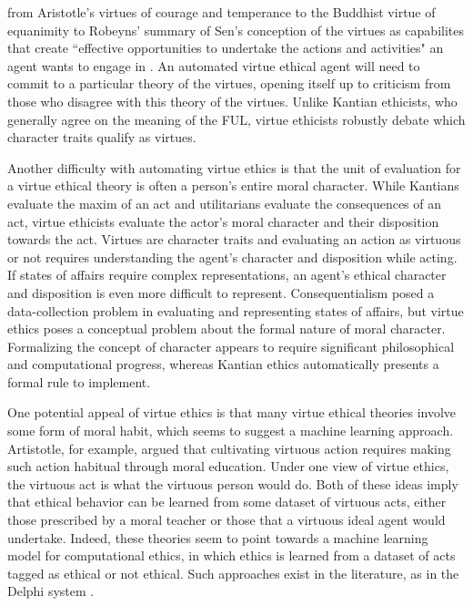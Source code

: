 \begin{isabellebody}
\begin{isamarkuptext}
from Aristotle's virtues of courage and temperance to the Buddhist virtue of 
equanimity to Robeyns' summary of Sen's conception of the virtues as capabilites that create
``effective opportunities to undertake the actions and activities" an agent wants to engage in \cite{robeyns}. 
An automated virtue ethical agent will need to commit to a particular theory of the virtues, opening 
itself up to criticism from those who disagree with this theory of the virtues. Unlike Kantian ethicists, 
who generally agree on the meaning of the FUL, virtue ethicists robustly debate which character traits qualify as virtues.%
\end{isamarkuptext}\isamarkuptrue%
%
\isadelimdocument
%
\endisadelimdocument
%
\isatagdocument
%
\isamarkuptrue%
%
\endisatagdocument
{\isafolddocument}%
%
\isadelimdocument
%
\endisadelimdocument
%
\begin{isamarkuptext}%
Another difficulty with automating virtue ethics is that the unit of evaluation for a virtue ethical
theory is often a person's entire moral character. While Kantians evaluate the maxim of an act and utilitarians
evaluate the consequences of an act, virtue ethicists evaluate the actor's moral character and their 
disposition towards the act. Virtues are character traits and evaluating an action as virtuous or 
not requires understanding the agent's character and disposition while acting. If states of affairs
require complex representations, an agent's ethical character and disposition is even more difficult
to represent. Consequentialism posed a data-collection problem in evaluating and representing states
of affairs, but virtue ethics poses a conceptual problem about the formal nature of moral character.
Formalizing the concept of character appears to require significant philosophical and computational
progress, whereas Kantian ethics automatically presents a formal rule to implement.%
\end{isamarkuptext}\isamarkuptrue%
%
\isadelimdocument
%
\endisadelimdocument
%
\isatagdocument
%
\isamarkuptrue%
%
\endisatagdocument
{\isafolddocument}%
%
\isadelimdocument
%
\endisadelimdocument
%
\begin{isamarkuptext}%
One potential appeal of virtue ethics is that many virtue ethical theories involve some form of 
moral habit, which seems to suggest a machine learning approach. Artistotle, for example, argued 
that cultivating virtuous action requires making such action habitual through moral education. Under 
one view of virtue ethics, the virtuous act is what the virtuous person would do. Both of these ideas
imply that ethical behavior can be learned from some dataset of virtuous acts, either those 
prescribed by a moral teacher or those that a virtuous ideal agent would undertake. Indeed, these 
theories seem to point towards a machine learning model for computational ethics, in which ethics is 
learned from a dataset of acts tagged as ethical or not ethical. Such approaches exist in the literature, 
as in the Delphi system \cite{delphi}. 


\end{isamarkuptext}
\end{isabellebody}
